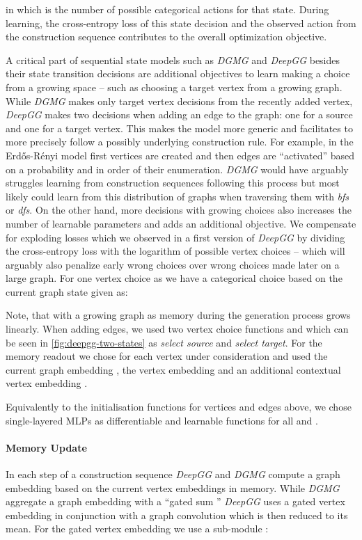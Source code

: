 \documentclass{article}
\begin{document}
in which  is the number of possible categorical actions for that state.
During learning, the cross-entropy loss of this state decision and the observed action from the construction sequence contributes to the overall optimization objective.

A critical part of sequential state models such as \textit{DGMG} and \textit{DeepGG} besides their state transition decisions are additional objectives to learn making a choice from a growing space -- such as choosing a target vertex from a growing graph.
While \textit{DGMG} makes only target vertex decisions from the recently added vertex, \textit{DeepGG} makes two decisions when adding an edge to the graph:
one for a source and one for a target vertex.
This makes the model more generic and facilitates to more precisely follow a possibly underlying construction rule.
For example, in the Erdős-Rényi model first  vertices are created and then edges are ``activated'' based on a probability and in order of their enumeration.
\textit{DGMG} would have arguably struggles learning from construction sequences following this process but most likely could learn from this distribution of graphs when traversing them with \textit{bfs} or \textit{dfs}.
On the other hand, more decisions with growing choices also increases the number of learnable parameters and adds an additional objective.
We compensate for exploding losses which we observed in a first version of \textit{DeepGG} by dividing the cross-entropy loss with the logarithm of possible vertex choices -- which will arguably also penalize early wrong choices over wrong choices made later on a large graph.
For one vertex choice  as  we have a categorical choice based on the current graph state given as:

Note, that with a growing graph as memory during the generation process  grows linearly.
When adding edges, we used two vertex choice functions  and  which can be seen in \autoref{fig:deepgg-two-states} as \textit{select source} and \textit{select target}.
For the memory readout we chose  for each vertex  under consideration and used the current graph embedding , the vertex embedding  and an additional contextual vertex  embedding .

Equivalently to the initialisation functions for vertices and edges above, we chose single-layered MLPs as differentiable and learnable functions for all  and .


\paragraph{Memory Update} In each step of a construction sequence \textit{DeepGG} and \textit{DGMG} compute a graph embedding based on the current vertex embeddings in memory.
While \textit{DGMG} aggregate a graph embedding with a ``gated sum '' \textit{DeepGG} uses a gated vertex embedding in conjunction with a graph convolution \cite{kipf2016semi} which is then reduced to its mean.
For the gated vertex embedding we use a sub-module :
\end{document}
